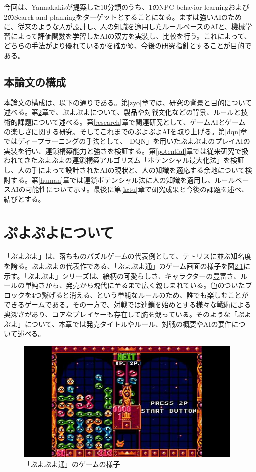 \documentclass[12pt]{jreport}
\begin{document}
今回は、Yannakakisが提案した10分類のうち、1のNPC behavior learningおよび2のSearch and planningをターゲットとすることになる。まずは強いAIのために、従来のような人が設計し、人の知識を適用したルールベースのAIと、機械学習によって評価関数を学習したAIの双方を実装し、比較を行う。これによって、どちらの手法がより優れているかを確かめ、今後の研究指針とすることが目的である。



\section{本論文の構成}
本論文の構成は、以下の通りである。第\ref{zyo}章では、研究の背景と目的について述べる。第\ref{puyopuyo}章で、ぷよぷよについて、製品や対戦文化などの背景、ルールと技術的課題について述べる。第\ref{research}章で関連研究として、ゲームAIとゲームの楽しさに関する研究、そしてこれまでのぷよぷよAIを取り上げる。第\ref{dqn}章ではディープラーニングの手法として、「DQN」を用いたぷよぷよのプレイAIの実装を行い、連鎖構築能力と強さを検証する。第\ref{potential}章では従来研究で扱われてきたぷよぷよの連鎖構築アルゴリズム「ポテンシャル最大化法」を検証し、人の手によって設計されたAIの現状と、人の知識を適応する余地について検討する。第\ref{human}章では連鎖ポテンシャル法に人の知識を適用し、ルールベースAIの可能性について示す。最後に第\ref{ketu}章で研究成果と今後の課題を述べ、結びとする。


\chapter{ぷよぷよについて} \label{puyopuyo} \setcounter{section}{0}
「ぷよぷよ」は、落ちものパズルゲームの代表例として、テトリスに並ぶ知名度を誇る。ぷよぷよの代表作である、「ぷよぷよ通」のゲーム画面の様子を図\ref{fig:puyotsu}に示す。「ぷよぷよ」シリーズは、絵柄の可愛らしさ、キャラクターの豊富さ、ルールの単純さから、発売から現代に至るまで広く親しまれている。色のついたブロックを4つ繋げると消える、という単純なルールのため、誰でも楽しむことができるゲームである。その一方で、対戦では連鎖を始めとする様々な戦術による奥深さがあり、コアなプレイヤーも存在して腕を競っている。そのような「ぷよぷよ」について、本章では発売タイトルやルール、対戦の概要やAIの要件について述べる。

\begin{figure}[bt]
  \begin{center}
  \includegraphics[height=6cm]{img/dqn_toko_5chain.jpg}
  \caption{「ぷよぷよ通」のゲームの様子} \label{fig:puyotsu}
\end{center}
\end{figure}
\end{document}
